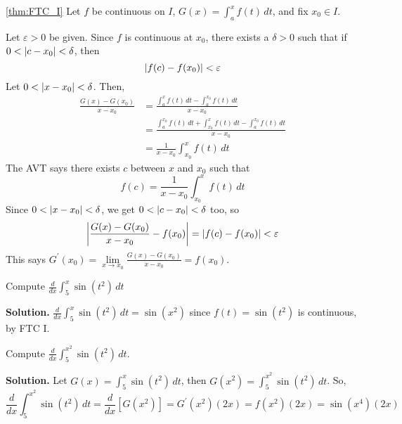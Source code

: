\begin{Proof}{\ref{thm:FTC_I}}{}
    Let $ f $ be continuous on $ I $, $ \displaystyle G(x)=\int_{a}^{x} f(t)\, d{t} $,
    and fix $ x_0\in I $.

    Let $ \varepsilon>0 $ be given. Since $ f $ is continuous at $ x_0 $,
    there exists a $ \delta>0 $ such that if $ 0<\abs{c-x_0}<\delta $, then
    \[ \abs{f(c)-f(x_0)}<\varepsilon \]
    Let $ 0<\abs{x-x_0}<\delta $. Then,
    \begin{align*}
        \frac{G(x)-G(x_0)}{x-x_0}
         & =\frac{\displaystyle\int_{a}^{x} f(t)\, d{t} -\int_{a}^{x_0} f(t)\, d{t} }
        {x-x_0}                                                                        \\
         & =\frac{\displaystyle\int_{a}^{x_0} f(t)\, d{t} +\int_{x_0}^{x} f(t)\, d{t}-
        \int_{a}^{x_0} f(t)\, d{t} }{x-x_0}                                            \\
         & =\frac{1}{x-x_0} \int_{x_0}^{x} f(t)\, d{t}
    \end{align*}
    The AVT says there exists $ c $ between $ x $ and $ x_0 $ such that
    \[ f(c)=\frac{1}{x-x_0} \int_{x_0}^{x} f(t)\, d{t}  \]
    Since $ 0<\abs{x-x_0}<\delta $, we get $ 0<\abs{c-x_0}<\delta $ too,
    so
    \[
        \abs*{\frac{G(x)-G(x_0)}{x-x_0}-f(x_0)}=\abs{f(c)-f(x_0)}<\varepsilon
    \]
    This says
    $ \displaystyle G^\prime(x_0)=\lim\limits_{{x} \to {x_0}} \frac{G(x)-G(x_0)}{x-x_0}=f(x_0) $.
\end{Proof}

\begin{Example}{}{}
    Compute $ \displaystyle \frac{d}{dx}\int_{5}^{x} \sin(t^2)\, d{t} $

    \textbf{Solution.}
    $ \displaystyle \frac{d}{dx}\int_{5}^{x} \sin(t^2)\, d{t}=\sin(x^2) $
    since $ f(t)=\sin(t^2) $ is continuous, by FTC I.
\end{Example}

\begin{Example}{}{}
    Compute
    $ \displaystyle \frac{d}{dx}\int_{5}^{x^2} \sin(t^2)\, d{t} $.

    \textbf{Solution.} Let $ \displaystyle G(x)=\int_{5}^{x} \sin(t^2)\, d{t} $,
    then $ G(x^2)=\displaystyle \int_{5}^{x^2} \sin(t^2)\, d{t} $. So,
    \[
        \frac{d}{dx} \int_{5}^{x^2} \sin(t^2)\, d{t}
        =\frac{d}{dx} \left[ G(x^2) \right]
        =G^\prime(x^2) (2x)
        =f(x^2)(2x)
        =\sin(x^4) (2x)
    \]
\end{Example}


